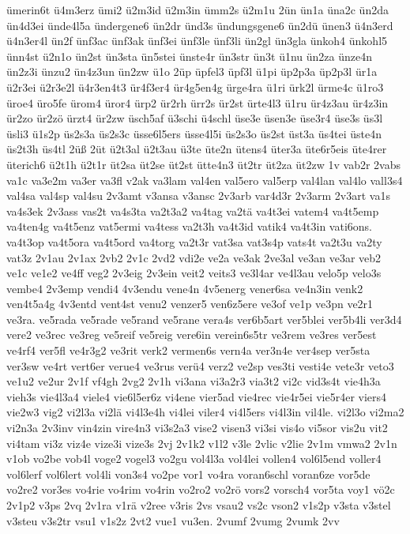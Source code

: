 {ümerin6t
ü4m3erz
ümi2
ü2m3id
ü2m3in
ümm2s
ü2m1u
2ün
ün1a
üna2c
ün2da
ün4d3ei
ünde4l5a
ündergene6
ün2dr
ünd3s
ündungsgene6
ün2dü
ünen3
ü4n3erd
ü4n3er4l
ün2f
ünf3ac
ünf3ak
ünf3ei
ünf3le
ünf3li
ün2gl
ün3gla
ünkoh4
ünkohl5
ünn4st
ü2n1o
ün2st
ün3sta
ün5stei
ünste4r
ün3str
ün3t
ü1nu
ün2za
ünze4n
ün2z3i
ünzu2
ün4z3un
ün2zw
ü1o
2üp
üpfel3
üpf3l
ü1pi
üp2p3a
üp2p3l
ür1a
ü2r3ei
ü2r3e2l
ü4r3en4t3
ür4f3er4
ür4g5en4g
ürge4ra
ü1ri
ürk2l
ürme4c
ü1ro3
üroe4
üro5fe
ürom4
üror4
ürp2
ür2rh
ürr2s
ür2st
ürte4l3
ü1ru
ür4z3au
ür4z3in
ür2zo
ür2zö
ürzt4
ür2zw
üsch5af
ü3schi
ü4schl
üse3e
üsen3e
üse3r4
üse3s
üs3l
üsli3
ü1s2p
üs2s3a
üs2s3c
üsse6l5ers
üsse4l5i
üs2s3o
üs2st
üst3a
üs4tei
üste4n
üs2t3h
üs4tl
2üß
2üt
ü2t3al
ü2t3au
ü3te
üte2n
ütens4
üter3a
üte6r5eis
üte4rer
üterich6
ü2t1h
ü2t1r
üt2sa
üt2se
üt2st
ütte4n3
üt2tr
üt2za
üt2zw
1v
vab2r
2vabs
va1c
va3e2m
va3er
va3fl
v2ak
va3lam
val4en
val5ero
val5erp
val4lan
val4lo
vall3s4
val4sa
val4sp
val4su
2v3amt
v3ansa
v3ansc
2v3arb
var4d3r
2v3arm
2v3art
va1s
va4s3ek
2v3ass
vas2t
va4s3ta
va2t3a2
va4tag
va2tä
va4t3ei
vatem4
va4t5emp
va4ten4g
va4t5enz
vat5ermi
va4tess
va2t3h
va4t3id
vatik4
va4t3in
vati6ons.
va4t3op
va4t5ora
va4t5ord
va4torg
va2t3r
vat3sa
vat3s4p
vats4t
va2t3u
va2ty
vat3z
2v1au
2v1ax
2vb2
2v1c
2vd2
vdi2e
ve2a
ve3ak
2ve3al
ve3an
ve3ar
veb2
ve1c
ve1e2
ve4ff
veg2
2v3eig
2v3ein
veit2
veits3
ve3l4ar
ve4l3au
velo5p
velo3s
vembe4
2v3emp
vendi4
4v3endu
vene4n
4v5energ
vener6sa
ve4n3in
venk2
ven4t5a4g
4v3entd
vent4st
venu2
venzer5
ven6z5ere
ve3of
ve1p
ve3pn
ve2r1
ve3ra.
ve5rada
ve5rade
ve5rand
ve5rane
vera4s
ver6b5art
ver5blei
ver5b4li
ver3d4
vere2
ve3rec
ve3reg
ve5reif
ve5reig
vere6in
verein6s5tr
ve3rem
ve3res
ver5est
ve4rf4
ver5fl
ve4r3g2
ve3rit
verk2
vermen6s
vern4a
ver3n4e
ver4sep
ver5sta
ver3sw
ve4rt
vert6er
verue4
ve3rus
verü4
verz2
ve2sp
ves3ti
vesti4e
vete3r
veto3
ve1u2
ve2ur
2v1f
vf4gh
2vg2
2v1h
vi3ana
vi3a2r3
via3t2
vi2c
vid3s4t
vie4h3a
vieh3s
vie4l3a4
viele4
vie6l5er6z
vi4ene
vier5ad
vie4rec
vie4r5ei
vie5r4er
viers4
vie2w3
vig2
vi2l3a
vi2lä
vi4l3e4h
vi4lei
viler4
vi4l5ers
vi4l3in
vil4le.
vi2l3o
vi2ma2
vi2n3a
2v3inv
vin4zin
vire4n3
vi3s2a3
vise2
visen3
vi3si
vis4o
vi5sor
vis2u
vit2
vi4tam
vi3z
viz4e
vize3i
vize3s
2vj
2v1k2
v1l2
v3le
2vlic
v2lie
2v1m
vmwa2
2v1n
v1ob
vo2be
vob4l
voge2
vogel3
vo2gu
vol4l3a
vol4lei
vollen4
vol6l5end
voller4
vol6lerf
vol6lert
vol4li
von3s4
vo2pe
vor1
vo4ra
voran6schl
voran6ze
vor5de
vo2re2
vor3es
vo4rie
vo4rim
vo4rin
vo2ro2
vo2rö
vors2
vorsch4
vor5ta
voy1
vö2c
2v1p2
v3ps
2vq
2v1ra
v1rä
v2ree
v3ris
2vs
vsau2
vs2c
vson2
v1s2p
v3sta
v3stel
v3steu
v3s2tr
vsu1
v1s2z
2vt2
vue1
vu3en.
2vumf
2vumg
2vumk
2vv
}
